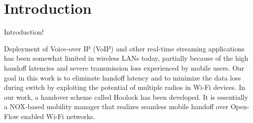 \section{Introduction}

Introduction!

Deployment of Voice-over IP (VoIP) and other real-time streaming applications has been somewhat limited in wireless LANs today, partially because of the high handoff latencies and severe transmission loss experienced by mobile users. Our goal in this work is to eliminate handoff latency and to minimize the data loss during switch by exploiting the potential of multiple radios in Wi-Fi devices. In our work, a handover scheme called Hoolock has been developed. It is essentially a NOX-based mobility manager that realizes seamless mobile handoff over Open-Flow enabled Wi-Fi networks.
